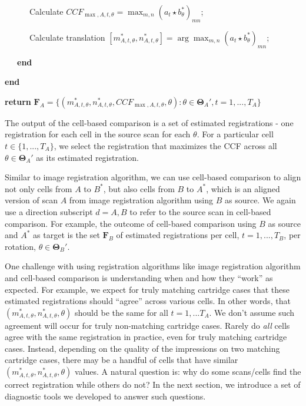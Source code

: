 \documentclass[11pt,]{isuthesis}
\begin{document}
~~~~~~Calculate \(CCF_{\max,A,t,\theta} = \max_{m,n} (a_t \star b_{\theta}^*)_{mn}\);

~~~~~~Calculate translation \([m_{A,t,\theta}^*, n_{A,t,\theta}^*] = \arg \max_{m,n} (a_t \star b_{\theta}^*)_{mn}\);

~~~\textbf{end}

\textbf{end}

\textbf{return} \(\pmb{F}_A = \{(m_{A,t,\theta}^*, n_{A,t,\theta}^*, CCF_{\max,A,t,\theta}, \theta) : \theta \in \pmb{\Theta}_{A}', t = 1,...,T_A\}\)

The output of the cell-based comparison is a set of estimated registrations - one registration for each cell in the source scan for each \(\theta\).
For a particular cell \(t \in \{1,...,T_A\}\), we select the registration that maximizes the CCF across all \(\theta \in \pmb{\Theta}_A'\) as its estimated registration.

Similar to image registration algorithm, we can use cell-based comparison to align not only cells from \(A\) to \(B^*\), but also cells from \(B\) to \(A^*\), which is an aligned version of scan \(A\) from image registration algorithm using \(B\) as source.
We again use a direction subscript \(d = A,B\) to refer to the source scan in cell-based comparison.
For example, the outcome of cell-based comparison using \(B\) as source and \(A^*\) as target is the set \(\pmb{F}_B\) of estimated registrations per cell, \(t = 1,...,T_B\), per rotation, \(\theta \in \pmb{\Theta}_B'\).

One challenge with using registration algorithms like image registration algorithm and cell-based comparison is understanding when and how they ``work'' as expected.
For example, we expect for truly matching cartridge cases that these estimated registrations should ``agree'' across various cells.
In other words, that \((m^*_{A,t,\theta},n^*_{A,t,\theta}, \theta)\) should be the same for all \(t = 1,...T_A\).
We don't assume such agreement will occur for truly non-matching cartridge cases.
Rarely do \emph{all} cells agree with the same registration in practice, even for truly matching cartridge cases.
Instead, depending on the quality of the impressions on two matching cartridge cases, there may be a handful of cells that have similar \((m^*_{A,t,\theta},n^*_{A,t,\theta}, \theta)\) values.
A natural question is: why do some scans/cells find the correct registration while others do not?
In the next section, we introduce a set of diagnostic tools we developed to answer such questions.
\end{document}

